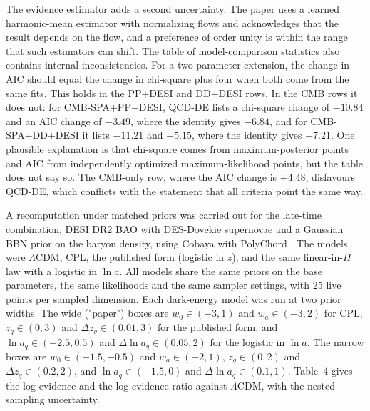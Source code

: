 \documentclass[11pt]{article}
\begin{document}
The evidence estimator adds a second uncertainty. The paper uses a learned harmonic-mean estimator with normalizing flows \cite{McEwen2021} and acknowledges that the result depends on the flow, and a preference of order unity is within the range that such estimators can shift. The table of model-comparison statistics also contains internal inconsistencies. For a two-parameter extension, the change in AIC should equal the change in chi-square plus four when both come from the same fits. This holds in the PP+DESI and DD+DESI rows. In the CMB rows it does not: for CMB-SPA+PP+DESI, QCD-DE lists a chi-square change of $-10.84$ and an AIC change of $-3.49$, where the identity gives $-6.84$, and for CMB-SPA+DD+DESI it lists $-11.21$ and $-5.15$, where the identity gives $-7.21$. One plausible explanation is that chi-square comes from maximum-posterior points and AIC from independently optimized maximum-likelihood points, but the table does not say so. The CMB-only row, where the AIC change is $+4.48$, disfavours QCD-DE, which conflicts with the statement that all criteria point the same way.

A recomputation under matched priors was carried out for the late-time combination, DESI DR2 BAO with DES-Dovekie supernovae and a Gaussian BBN prior on the baryon density, using Cobaya with PolyChord \cite{Cobaya2021,PolyChord2015}. The models were $\Lambda$CDM, CPL, the published form (logistic in $z$), and the same linear-in-$H$ law with a logistic in $\ln a$. All models share the same priors on the base parameters, the same likelihoods and the same sampler settings, with 25 live points per sampled dimension. Each dark-energy model was run at two prior widths. The wide ("paper") boxes are $w_0\in(-3,1)$ and $w_a\in(-3,2)$ for CPL, $z_q\in(0,3)$ and $\Delta z_q\in(0.01,3)$ for the published form, and $\ln a_q\in(-2.5,0.5)$ and $\Delta\ln a_q\in(0.05,2)$ for the logistic in $\ln a$. The narrow boxes are $w_0\in(-1.5,-0.5)$ and $w_a\in(-2,1)$, $z_q\in(0,2)$ and $\Delta z_q\in(0.2,2)$, and $\ln a_q\in(-1.5,0)$ and $\Delta\ln a_q\in(0.1,1)$. Table~4 gives the log evidence and the log evidence ratio against $\Lambda$CDM, with the nested-sampling uncertainty.
\end{document}
